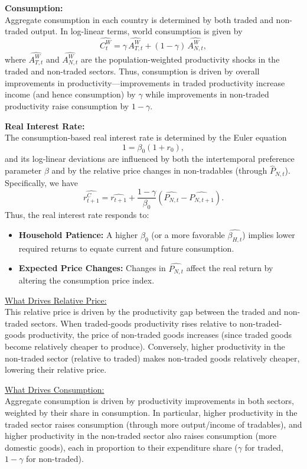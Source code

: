 \documentclass[a4paper,12pt]{article} %
\theoremstyle{nonitalic}
\begin{document}
\textbf{Consumption:} \\
Aggregate consumption in each country is determined by both traded and non-traded output. In log-linear terms, world consumption is given by
\[
\widehat{C_t^W} = \gamma\,\widehat{A_{T,t}^W} + (1-\gamma)\,\widehat{A_{N,t}^W},
\]
where \( \widehat{A_{T,t}^W} \) and \( \widehat{A_{N,t}^W} \) are the population-weighted productivity shocks in the traded and non-traded sectors. Thus, consumption is driven by overall improvements in productivity—improvements in traded productivity increase income (and hence consumption) by \( \gamma \) while improvements in non-traded productivity raise consumption by \( 1-\gamma \).

\textbf{Real Interest Rate:}  \\
The consumption-based real interest rate is determined by the Euler equation
\[
1 = \beta_0 (1+r_0),
\]
and its log-linear deviations are influenced by both the intertemporal preference parameter \( \beta \) and by the relative price changes in non-tradables (through \( \widehat{P}_{N,t} \)). Specifically, we have
\[
\widehat{r_{t+1}^C} = \widehat{r_{t+1}} + \frac{1-\gamma}{\beta_0}\left(\widehat{P_{N,t}} - \widehat{P_{N,t+1}}\right).
\]
Thus, the real interest rate responds to:
\begin{itemize}
    \item \textbf{Household Patience:} A higher \( \beta_0 \) (or a more favorable \( \widehat{\beta_{H,t}} \)) implies lower required returns to equate current and future consumption.
    \item \textbf{Expected Price Changes:} Changes in \( \widehat{P_{N,t}} \) affect the real return by altering the consumption price index.
\end{itemize}

\underline{What Drives Relative Price:} \\
This relative price is driven by the productivity gap between the traded and non-traded sectors. 
When traded-goods productivity rises relative to non-traded-goods productivity, 
the price of non-traded goods increases (since traded goods become relatively cheaper to produce). 
Conversely, higher productivity in the non-traded sector (relative to traded) makes non-traded goods relatively cheaper, 
lowering their relative price.

\underline{What Drives Consumption:} \\
Aggregate consumption is driven by productivity improvements in both sectors, 
weighted by their share in consumption. 
In particular, higher productivity in the traded sector raises consumption (through more output/income of tradables), 
and higher productivity in the non-traded sector also raises consumption (more domestic goods), 
each in proportion to their expenditure share ($\gamma$ for traded, $1-\gamma$ for non-traded).
\end{document}
